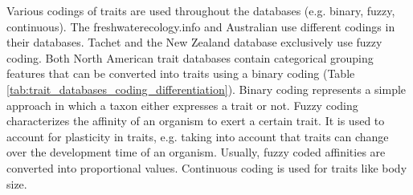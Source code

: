 \documentclass[../Draft_harmonization_paper.tex]{subfiles}
\begin{document}
Various codings of traits are used throughout the databases (e.g. binary, fuzzy, continuous). The freshwaterecology.info and Australian use different codings in their databases. Tachet and the New Zealand database exclusively use fuzzy coding. Both North American trait databases contain categorical grouping features that can be converted into traits using a binary coding (Table \ref{tab:trait_databases_coding_differentiation}). Binary coding represents a simple approach in which a taxon either expresses a trait or not. Fuzzy coding characterizes the affinity of an organism to exert a certain trait. It is used to account for plasticity in traits, e.g. taking into account that traits can change over the development time of an organism. Usually, fuzzy coded affinities are converted into proportional values. Continuous coding is used for traits like body size.



\end{document}
